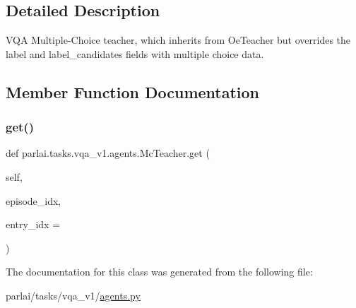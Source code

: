 \subsection{Detailed Description}
\begin{DoxyVerb}VQA Multiple-Choice teacher, which inherits from OeTeacher but overrides the label
and label_candidates fields with multiple choice data.
\end{DoxyVerb}
 

\subsection{Member Function Documentation}
\mbox{\label{classparlai_1_1tasks_1_1vqa__v1_1_1agents_1_1McTeacher_acfe24f89d048cb6e8ccd745838223f07}} 
\subsubsection{\texorpdfstring{get()}{get()}}
{\footnotesize\ttfamily def parlai.\+tasks.\+vqa\+\_\+v1.\+agents.\+Mc\+Teacher.\+get (\begin{DoxyParamCaption}\item[{}]{self,  }\item[{}]{episode\+\_\+idx,  }\item[{}]{entry\+\_\+idx = {} }\end{DoxyParamCaption})}



The documentation for this class was generated from the following file\+:\begin{DoxyCompactItemize}
\item 
parlai/tasks/vqa\+\_\+v1/\hyperlink{parlai_2tasks_2vqa__v1_2agents_8py}{agents.\+py}\end{DoxyCompactItemize}
